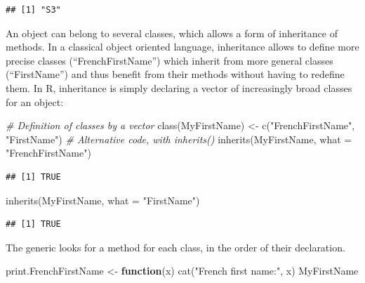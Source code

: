 \documentclass[
  12pt,
  american,
  a4paper,
  extrafontsizes,onecolumn,openright
  ]{memoir}
\newenvironment{Shaded}{\begin{snugshade}}{\end{snugshade}}
\newcommand{\AttributeTok}[1]{\textcolor[rgb]{0.77,0.63,0.00}{#1}}
\newcommand{\CommentTok}[1]{\textcolor[rgb]{0.56,0.35,0.01}{\textit{#1}}}
\newcommand{\ControlFlowTok}[1]{\textcolor[rgb]{0.13,0.29,0.53}{\textbf{#1}}}
\newcommand{\FunctionTok}[1]{\textcolor[rgb]{0.00,0.00,0.00}{#1}}
\newcommand{\NormalTok}[1]{#1}
\newcommand{\OtherTok}[1]{\textcolor[rgb]{0.56,0.35,0.01}{#1}}
\newcommand{\StringTok}[1]{\textcolor[rgb]{0.31,0.60,0.02}{#1}}
\begin{document}
\begin{verbatim}
## [1] "S3"
\end{verbatim}

\normalsize

An object can belong to several classes, which allows a form of inheritance of methods.
In a classical object oriented language, inheritance allows to define more precise classes (\enquote{FrenchFirstName}) which inherit from more general classes (\enquote{FirstName}) and thus benefit from their methods without having to redefine them.
In R, inheritance is simply declaring a vector of increasingly broad classes for an object:

\scriptsize

\begin{Shaded}
\begin{Highlighting}[]
\CommentTok{\# Definition of classes by a vector}
\FunctionTok{class}\NormalTok{(MyFirstName) }\OtherTok{\textless{}{-}} \FunctionTok{c}\NormalTok{(}\StringTok{"FrenchFirstName"}\NormalTok{, }\StringTok{"FirstName"}\NormalTok{)}
\CommentTok{\# Alternative code, with inherits()}
\FunctionTok{inherits}\NormalTok{(MyFirstName, }\AttributeTok{what =} \StringTok{"FrenchFirstName"}\NormalTok{)}
\end{Highlighting}
\end{Shaded}

\begin{verbatim}
## [1] TRUE
\end{verbatim}

\begin{Shaded}
\begin{Highlighting}[]
\FunctionTok{inherits}\NormalTok{(MyFirstName, }\AttributeTok{what =} \StringTok{"FirstName"}\NormalTok{)}
\end{Highlighting}
\end{Shaded}

\begin{verbatim}
## [1] TRUE
\end{verbatim}

\normalsize

The generic looks for a method for each class, in the order of their declaration.

\scriptsize

\begin{Shaded}
\begin{Highlighting}[]
\NormalTok{print.FrenchFirstName }\OtherTok{\textless{}{-}} \ControlFlowTok{function}\NormalTok{(x) }\FunctionTok{cat}\NormalTok{(}\StringTok{"French first name:"}\NormalTok{,}
\NormalTok{    x)}
\NormalTok{MyFirstName}
\end{Highlighting}
\end{Shaded}
\end{document}
